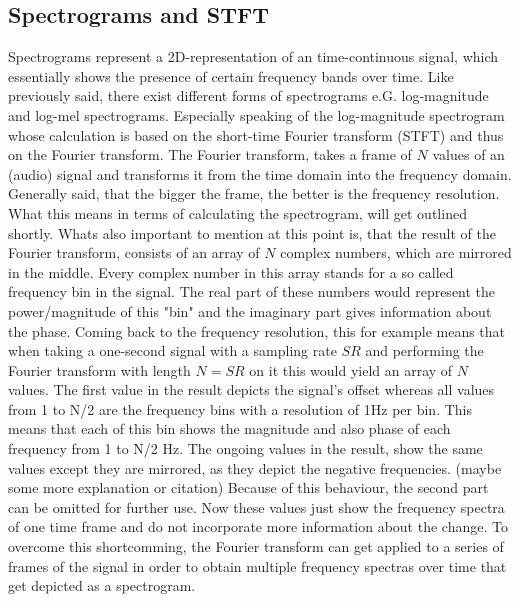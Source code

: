 \subsection{Spectrograms and STFT}
Spectrograms represent a 2D-representation of an time-continuous signal, which essentially shows the presence of certain frequency bands over time. Like previously said, there exist different forms of spectrograms e.G. log-magnitude and log-mel spectrograms. Especially speaking of the log-magnitude spectrogram whose calculation is based on the short-time Fourier transform (STFT) and thus on the Fourier transform. The Fourier transform, takes a frame of $N$ values of an (audio) signal and transforms it from the time domain into the frequency domain. Generally said, that the bigger the frame, the better is the frequency resolution. What this means in terms of calculating the spectrogram, will get outlined shortly. Whats also important to mention at this point is, that the result of the Fourier transform, consists of an array of $N$ complex numbers, which are mirrored in the middle. Every complex number in this array stands for a so called frequency bin in the signal. The real part of these numbers would represent the power/magnitude of this "bin" and the imaginary part gives information about the phase. Coming back to the frequency resolution, this for example means that when taking a one-second signal with a sampling rate $SR$ and performing the Fourier transform with length $N=SR$ on it this would yield an array of $N$ values. The first value in the result depicts the signal's offset whereas all values from 1 to N/2 are the frequency bins with a resolution of 1Hz per bin. This means that each of this bin shows the magnitude and also phase of each frequency from 1 to N/2 Hz. The ongoing values in the result, show the same values except they are mirrored, as they depict the negative frequencies. (maybe some more explanation or citation) Because of this behaviour, the second part can be omitted for further use. Now these values just show the frequency spectra of one time frame and do not incorporate more information about the change. To overcome this shortcomming, the Fourier transform can get applied to a series of frames of the signal in order to obtain multiple frequency spectras over time that get depicted as a spectrogram.\\

